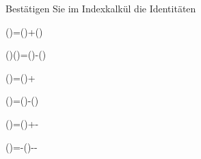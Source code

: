 \begin{atiTask}[
  title = Vektoroperatoridentitäten II
]
Bestätigen Sie im Indexkalkül die Identitäten
\begin{atiSubequations}
\item{\gradient ()=(\gradient)+(\gradient)}
%
\item{(\gradient)(\times {})=\times (\gradient )-\times (\gradient)}
%
\item{(\nabla {})=(\gradient)+\divergence {}}
%
\item{(\times {})\curl {}=(\gradient)-(\gradient)}
%
\item{(\times \gradient)\times {}=(\gradient)+\times \curl {}-\divergence {}}
%
\item{(\nabla\times{})\times{}=\divergence {}-(\gradient)-\times \curl {}-\times \curl {}}
%
\end{atiSubequations}

\end{atiTask}

\begin{atiSolution}
	
\end{atiSolution}